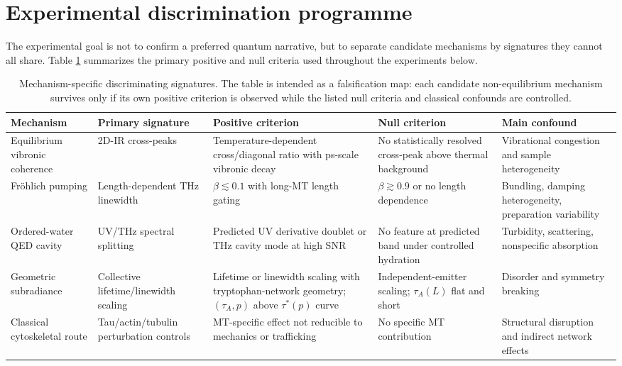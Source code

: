 \documentclass[twocolumn,10pt]{article}
\begin{document}
\section{Experimental discrimination programme}
\label{sec:experimental_discrimination}
The experimental goal is not to confirm a preferred quantum narrative, but to
separate candidate mechanisms by signatures they cannot all share. Table
\ref{tab:mechanism_discrimination} summarizes the primary positive and null
criteria used throughout the experiments below.
\begin{table}[t]
\centering
\caption{Mechanism-specific discriminating signatures. The table is intended as
a falsification map: each candidate non-equilibrium mechanism survives only if
its own positive criterion is observed while the listed null criteria and
classical confounds are controlled.}
\label{tab:mechanism_discrimination}
\footnotesize
\begin{tabular}{p{2.6cm}p{3.0cm}p{3.5cm}p{3.0cm}p{3.2cm}}
\toprule
Mechanism & Primary signature & Positive criterion & Null criterion & Main confound \\
\midrule
Equilibrium vibronic coherence & 2D-IR cross-peaks & Temperature-dependent cross/diagonal ratio with ps-scale vibronic decay & No statistically resolved cross-peak above thermal background & Vibrational congestion and sample heterogeneity \\
Fr\"ohlich pumping & Length-dependent THz linewidth & $\beta\lesssim0.1$ with long-MT length gating & $\beta\gtrsim0.9$ or no length dependence & Bundling, damping heterogeneity, preparation variability \\
Ordered-water QED cavity & UV/THz spectral splitting & Predicted UV derivative doublet or THz cavity mode at high SNR & No feature at predicted band under controlled hydration & Turbidity, scattering, nonspecific absorption \\
Geometric subradiance & Collective lifetime/linewidth scaling & Lifetime or linewidth scaling with tryptophan-network geometry; $(\tau_A,p)$ above $\tau^*(p)$ curve & Independent-emitter scaling; $\tau_A(L)$ flat and short & Disorder and symmetry breaking \\
Classical cytoskeletal route & Tau/actin/tubulin perturbation controls & MT-specific effect not reducible to mechanics or trafficking & No specific MT contribution & Structural disruption and indirect network effects \\
\bottomrule
\end{tabular}
\end{table}
\end{document}
